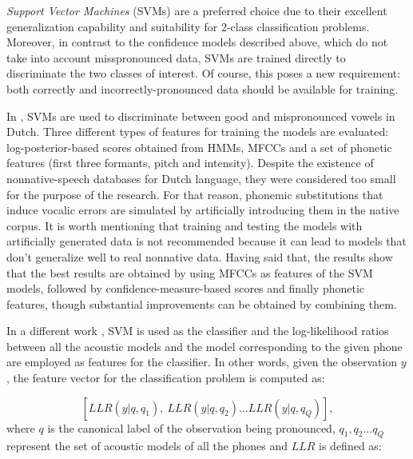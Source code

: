 \textit{Support Vector Machines} (SVMs) are a preferred choice
due to their excellent generalization capability and suitability for 2-class classification
problems. Moreover, in contrast to the confidence models described above, which do not take into
account misspronounced data, SVMs are trained directly to discriminate the two classes of interest.
Of course, this poses a new requirement: both correctly and incorrectly-pronounced data should be
available for training.

In \cite{detection_mispronunciation_dutch_vowel}, SVMs are used to discriminate
between good and mispronounced vowels in Dutch.
Three different types of features for training the models are evaluated: log-posterior-based
scores obtained from HMMs, MFCCs and a set of
phonetic features (first three formants, pitch and intensity). Despite the existence of nonnative-speech
databases for Dutch language, they were considered too small for the purpose of the research.
For that reason, phonemic
substitutions that induce vocalic errors are simulated by artificially introducing them in the native corpus. It is worth mentioning that training
and testing the models with artificially generated data is not recommended
because it can lead to models that don't generalize well to real nonnative data.
Having said that, the results show that the best
results are obtained by using MFCCs as features of the SVM models, followed by confidence-measure-based
scores and finally phonetic
features, though substantial improvements can be obtained by combining them.

In a different work \cite{svm_space_models}, SVM is used as the classifier and the
log-likelihood ratios between all the acoustic models and the model corresponding to the given
phone are employed as features for the classifier. In other words, given the observation
$y$, the feature vector for the classification problem is computed as:

\begin{equation}
\label{eq:psm}
[LLR(y|q,q_{1}), \ LLR(y|q,q_{2}) \dotsc LLR(y|q, q_{Q})],
\end{equation}
where $q$ is the canonical label of the observation being pronounced, {$q_{1}, q_{2}
\dotsc q_{Q}$} represent the set of acoustic models of all the phones and $LLR$ is defined as:

